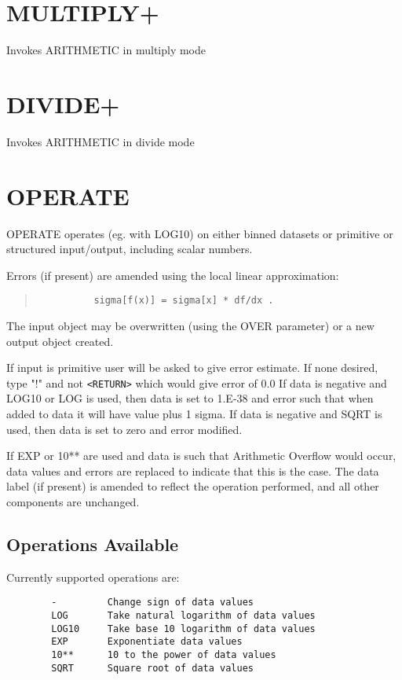 \documentclass{book}
\renewcommand{\_}{{\tt\char'137}}     %
\begin{document}
\section{MULTIPLY+}
Invokes ARITHMETIC in multiply mode
\section{DIVIDE+}
Invokes ARITHMETIC in divide mode
\section{OPERATE}
OPERATE operates (eg. with LOG10) on either binned datasets or
primitive or structured input/output, including scalar numbers.
 
Errors (if present) are amended using the local linear
approximation:
 
\begin{quote}\begin{verbatim}
          sigma[f(x)] = sigma[x] * df/dx .
\end{verbatim}\end{quote}
The input object may be overwritten (using the OVER parameter) or
a new output object created.
 
If input is primitive user will be asked to give error estimate.
If none desired, type "!" and not \verb+<RETURN>+ which would give
error of 0.0 If data is negative and LOG10 or LOG is used, then
data is set to 1.E-38 and error such that when added to data it
will have value plus 1 sigma. If data is negative and SQRT is
used, then data is set to zero and error modified.
 
If EXP or 10** are used and data is such that Arithmetic Overflow
would occur, data values and errors are replaced to indicate that
this is the case. The data label (if present) is amended to
reflect the operation performed, and all other components are
unchanged.
 
\subsection{Operations Available}
Currently supported operations are:
\begin{verbatim}
        -         Change sign of data values
        LOG       Take natural logarithm of data values
        LOG10     Take base 10 logarithm of data values
        EXP       Exponentiate data values
        10**      10 to the power of data values
        SQRT      Square root of data values
\end{verbatim}
\end{document}
